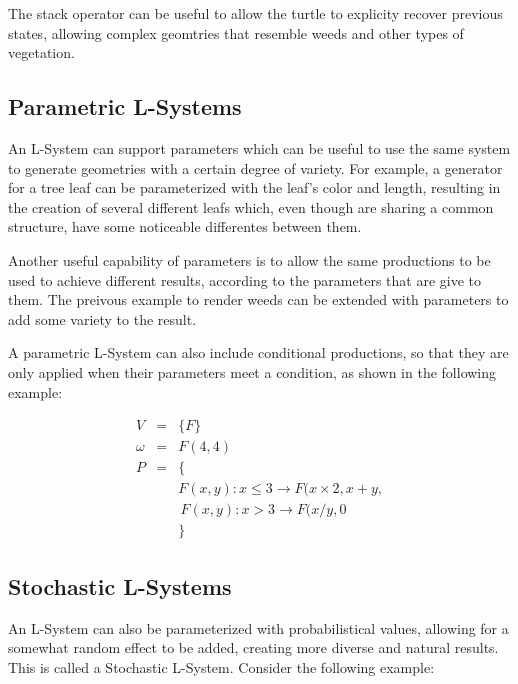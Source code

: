 \documentclass{acmtog}
\begin{document}
The stack operator can be useful to allow the turtle to explicity recover previous states, allowing complex geomtries that resemble weeds and other types of vegetation.

\subsection{Parametric L-Systems}
\label{subsec:parametric}

An L-System can support parameters which can be useful to use the same system to generate geometries with a certain degree of variety. For example, a generator for a tree leaf can be parameterized with the leaf's color and length, resulting in the creation of several different leafs which, even though are sharing a common structure, have some noticeable differentes between them.

Another useful capability of parameters is to allow the same productions to be used to achieve different results, according to the parameters that are give to them. The preivous example to render weeds can be extended with parameters to add some variety to the result.

A parametric L-System can also include conditional productions, so that they are only applied when their parameters meet a condition, as shown in the following example:

\begin{eqnarray*}
  V       &=& \{F\}                                               \\
  \omega  &=& F(4,4)                                              \\
  P       &=& \{                                                  \\
          & & F(x,y) : x \leq 3 \rightarrow F(x \times 2, x + y,  \\
          & & \, F(x,y) : x >    3 \rightarrow F(x / y, 0\        \\
          & & \}                                                  
  \label{eq:example3}
\end{eqnarray*}

\subsection{Stochastic L-Systems}
\label{subsec:stochastic}

An L-System can also be parameterized with probabilistical values, allowing for a somewhat random effect to be added, creating more diverse and natural results. This is called a Stochastic L-System. Consider the following example:
\end{document}
